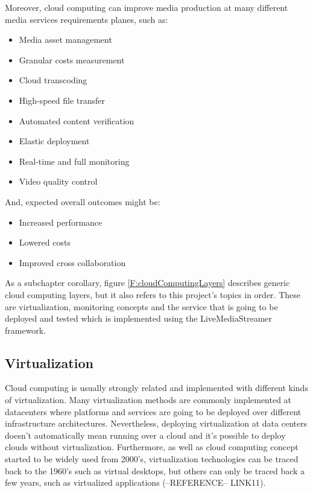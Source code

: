 Moreover, cloud computing can improve media production at many different media services requirements planes, such as:

\begin{itemize}
\item Media asset management
\item Granular costs measurement
\item Cloud transcoding
\item High-speed file transfer
\item Automated content verification
\item Elastic deployment
\item Real-time and full monitoring
\item Video quality control
\end{itemize}

And, expected overall outcomes might be:

\begin{itemize}
\item Increased performance
\item Lowered costs
\item Improved cross collaboration
\end{itemize}

As a subchapter corollary, figure \ref{F:cloudComputingLayers} describes generic cloud computing layers, but it also refers to this project's topics in order. These are virtualization, monitoring concepts and the service that is going to be deployed and tested which is implemented using the LiveMediaStreamer framework.

\subsection{Virtualization}\label{SOA:Virtualization}

Cloud computing is usually strongly related and implemented with different kinds of virtualization. Many virtualization methods are commonly implemented at datacenters where platforms and services are going to be deployed over different infrastructure architectures. Nevertheless, deploying virtualization at data centers doesn’t automatically mean running over a cloud and it’s possible to deploy clouds without virtualization. Furthermore, as well as cloud computing concept started to be widely used from 2000's, virtualization  technologies can be traced back to the 1960’s such as virtual desktops, but others can only be traced back a few years, such as virtualized applications (--REFERENCE-- LINK11).

